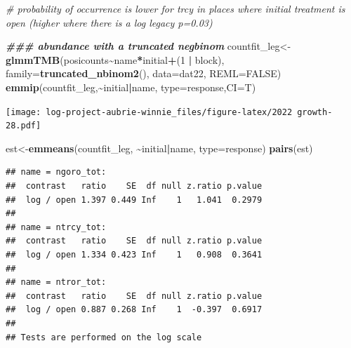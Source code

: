 \documentclass[
]{article}
\newenvironment{Shaded}{\begin{snugshade}}{\end{snugshade}}
\newcommand{\AttributeTok}[1]{\textcolor[rgb]{0.13,0.29,0.53}{#1}}
\newcommand{\CommentTok}[1]{\textcolor[rgb]{0.56,0.35,0.01}{\textit{#1}}}
\newcommand{\ConstantTok}[1]{\textcolor[rgb]{0.56,0.35,0.01}{#1}}
\newcommand{\DecValTok}[1]{\textcolor[rgb]{0.00,0.00,0.81}{#1}}
\newcommand{\DocumentationTok}[1]{\textcolor[rgb]{0.56,0.35,0.01}{\textbf{\textit{#1}}}}
\newcommand{\FunctionTok}[1]{\textcolor[rgb]{0.13,0.29,0.53}{\textbf{#1}}}
\newcommand{\NormalTok}[1]{#1}
\newcommand{\OtherTok}[1]{\textcolor[rgb]{0.56,0.35,0.01}{#1}}
\newcommand{\SpecialCharTok}[1]{\textcolor[rgb]{0.81,0.36,0.00}{\textbf{#1}}}
\newcommand{\StringTok}[1]{\textcolor[rgb]{0.31,0.60,0.02}{#1}}
\begin{document}
\begin{Shaded}
\begin{Highlighting}[]
\CommentTok{\# probability of occurrence is lower for trcy in places where initial treatment is open (higher where there is a log legacy p=0.03)}

\DocumentationTok{\#\#\# abundance with a truncated negbinom }
\NormalTok{countfit\_leg}\OtherTok{\textless{}{-}}\FunctionTok{glmmTMB}\NormalTok{(posicounts}\SpecialCharTok{\textasciitilde{}}\NormalTok{name}\SpecialCharTok{*}\NormalTok{initial}\SpecialCharTok{+}\NormalTok{(}\DecValTok{1} \SpecialCharTok{|}\NormalTok{ block), }\AttributeTok{family=}\FunctionTok{truncated\_nbinom2}\NormalTok{(), }\AttributeTok{data=}\NormalTok{dat22, }\AttributeTok{REML=}\ConstantTok{FALSE}\NormalTok{)}
\FunctionTok{emmip}\NormalTok{(countfit\_leg,}\SpecialCharTok{\textasciitilde{}}\NormalTok{initial}\SpecialCharTok{|}\NormalTok{name, }\AttributeTok{type=}\StringTok{\textquotesingle{}response\textquotesingle{}}\NormalTok{,}\AttributeTok{CI=}\NormalTok{T)}
\end{Highlighting}
\end{Shaded}

\texttt{[image: log-project-aubrie-winnie\_files/figure-latex/2022 growth-28.pdf]}

\begin{Shaded}
\begin{Highlighting}[]
\NormalTok{est}\OtherTok{\textless{}{-}}\FunctionTok{emmeans}\NormalTok{(countfit\_leg, }\SpecialCharTok{\textasciitilde{}}\NormalTok{initial}\SpecialCharTok{|}\NormalTok{name, }\AttributeTok{type=}\StringTok{\textquotesingle{}response\textquotesingle{}}\NormalTok{)}
\FunctionTok{pairs}\NormalTok{(est)}
\end{Highlighting}
\end{Shaded}

\begin{verbatim}
## name = ngoro_tot:
##  contrast   ratio    SE  df null z.ratio p.value
##  log / open 1.397 0.449 Inf    1   1.041  0.2979
## 
## name = ntrcy_tot:
##  contrast   ratio    SE  df null z.ratio p.value
##  log / open 1.334 0.423 Inf    1   0.908  0.3641
## 
## name = ntror_tot:
##  contrast   ratio    SE  df null z.ratio p.value
##  log / open 0.887 0.268 Inf    1  -0.397  0.6917
## 
## Tests are performed on the log scale
\end{verbatim}
\end{document}
